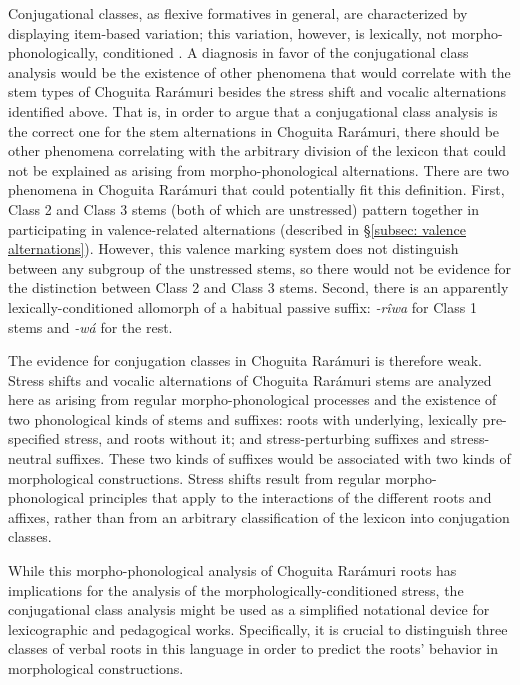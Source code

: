 Conjugational classes, as flexive formatives in general, are characterized by displaying item-based variation; this variation, however, is lexically, not morpho-phonologically, conditioned \parencite{bickel2007inflectional}. A diagnosis in favor of the conjugational class analysis would be the existence of other phenomena that would correlate with the stem types of Choguita Rarámuri besides the stress shift and vocalic alternations identified above. That is, in order to argue that a conjugational class analysis is the correct one for the stem alternations in Choguita Rarámuri, there should be other phenomena correlating with the arbitrary division of the lexicon that could not be explained as arising from morpho-phonological alternations. There are two phenomena in Choguita Rarámuri that could potentially fit this definition. First, Class 2 and Class 3 stems (both of which are unstressed) pattern together in participating in valence-related alternations (described in §\ref{subsec: valence alternations}). However, this valence marking system does not distinguish between any subgroup of the unstressed stems, so there would not be evidence for the distinction between Class 2 and Class 3 stems. Second, there is an apparently lexically-conditioned allomorph of a habitual passive suffix: \textit{{}-rîwa} for Class 1 stems and \textit{-wá} for the rest.

The evidence for conjugation classes in Choguita Rarámuri is therefore weak. Stress shifts and vocalic alternations of Choguita Rarámuri stems are analyzed here as arising from regular morpho-phonological processes and the existence of two phonological kinds of stems and suffixes: roots with underlying, lexically pre-specified stress, and roots without it; and stress-perturbing suffixes and stress-neutral suffixes. These two kinds of suffixes would be associated with two kinds of morphological constructions. Stress shifts result from regular morpho-phonological principles that apply to the interactions of the different roots and affixes, rather than from an arbitrary classification of the lexicon into conjugation classes.

While this morpho-phonological analysis of Choguita Rarámuri roots has implications for the analysis of the morphologically-conditioned stress, the conjugational class analysis might be used as a simplified notational device for  lexicographic and pedagogical works. Specifically, it is crucial to distinguish three classes of verbal roots in this language in order to predict the roots’ behavior in morphological constructions.

